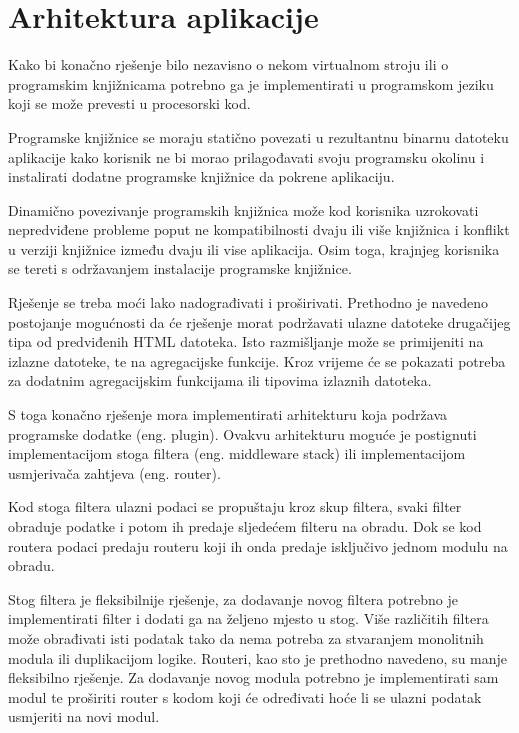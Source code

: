 \documentclass[times, utf8, zavrsni]{fer}
\begin{document}
\section{Arhitektura aplikacije}

Kako bi konačno rješenje bilo nezavisno o nekom virtualnom stroju ili o
programskim knjižnicama potrebno ga je implementirati u programskom jeziku
koji se može prevesti u procesorski kod.

Programske knjižnice se moraju statično povezati u rezultantnu binarnu
datoteku aplikacije kako korisnik ne bi morao prilagođavati svoju programsku
okolinu i instalirati dodatne programske knjižnice da pokrene aplikaciju.

Dinamično povezivanje programskih knjižnica može kod korisnika uzrokovati
nepredviđene probleme poput ne kompatibilnosti dvaju ili više knjižnica i
konflikt u verziji knjižnice između dvaju ili vise aplikacija. Osim toga,
krajnjeg korisnika se tereti s održavanjem instalacije programske knjižnice.

Rješenje se treba moći lako nadograđivati i proširivati. Prethodno je navedeno
postojanje mogućnosti da će rješenje morat podržavati ulazne datoteke
drugačijeg tipa od predviđenih HTML datoteka. Isto razmišljanje može se
primijeniti na izlazne datoteke, te na agregacijske funkcije. Kroz vrijeme će
se pokazati potreba za dodatnim agregacijskim funkcijama ili tipovima izlaznih
datoteka.

S toga konačno rješenje mora implementirati arhitekturu koja
podržava programske dodatke \cite{plugin_architecture_wiki}
(eng. plugin). Ovakvu arhitekturu moguće je
postignuti implementacijom stoga filtera \cite{middleware_wiki}
(eng. middleware stack) ili
implementacijom usmjerivača zahtjeva \cite{router_arhitecture_ieee}
(eng. router).

Kod stoga filtera ulazni podaci se propuštaju kroz skup filtera, svaki filter
obraduje podatke i potom ih predaje sljedećem filteru na obradu. Dok se kod
routera podaci predaju routeru koji ih onda predaje isključivo jednom modulu na
obradu.

Stog filtera je fleksibilnije rješenje, za dodavanje novog filtera potrebno
je implementirati filter i dodati ga na željeno mjesto u stog. Više različitih
filtera može obrađivati isti podatak tako da nema potreba za stvaranjem
monolitnih modula ili duplikacijom logike. Routeri, kao sto je prethodno
navedeno, su manje fleksibilno rješenje. Za dodavanje novog modula potrebno je
implementirati sam modul te proširiti router s kodom koji će određivati hoće li
se ulazni podatak usmjeriti na novi modul.
\end{document}
